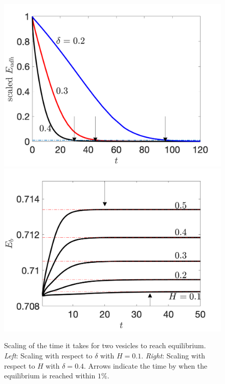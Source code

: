 \documentclass[prf,superscriptaddress,showpacs]{revtex4-1}
\begin{document}
\begin{figure}
\includegraphics[keepaspectratio=true,scale=0.4]{figs/Dec13a_time_scaling01.png}
\includegraphics[keepaspectratio=true,scale=0.4]{figs/Dec13a_time_scaling02.png}
\caption{\label{fig:qflow00} Scaling of the time it takes for two
  vesicles to reach equilibrium. {\em Left}: Scaling with respect to
  $\delta$ with $H=0.1$.  {\em Right}: Scaling with respect to $H$ with
  $\delta = 0.4$. Arrows indicate the time by when the equilibrium is
  reached within $1\%$.}
\end{figure}
\end{document}
